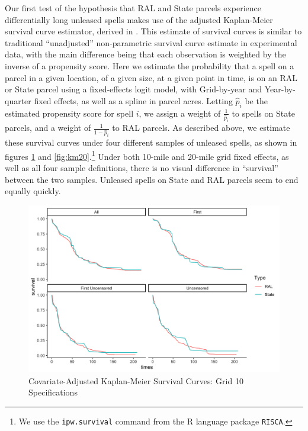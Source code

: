 \begin{appendices}
Our first test of the hypothesis that RAL and State parcels experience differentially long unleased spells makes use of the adjusted Kaplan-Meier survival curve estimator, derived in \cite{xie2005adjusted}.  This estimate of  survival curves is similar to traditional ``unadjusted'' non-parametric survival curve estimate in experimental data, with the main difference being that each observation is weighted by the inverse of a propensity score.  Here we estimate the probability that a spell on a parcel in a given location, of a given size, at a given point in time, is on an RAL or State parcel using a fixed-effects logit model, with Grid-by-year and Year-by-quarter fixed effects, as well as a spline in parcel acres.  Letting $\widehat{p}_i$ be the estimated propensity score for spell $i$, we assign a weight of $\frac{1}{\widehat{p}_i}$ to spells on State parcels, and a weight of $\frac{1}{1-\widehat{p}_i}$ to RAL parcels.  As described above, we estimate these survival curves under four different samples of unleased spells, as shown in figures \ref{fig:km10} and \ref{fig:km20}.\footnote{We use the \texttt{ipw.survival} command from the R language package \texttt{RISCA}.}  Under both 10-mile and 20-mile grid fixed effects, as well as all four sample definitions, there is no visual difference in ``survival'' between the two samples.  Unleased spells on State and RAL parcels seem to end equally quickly.

\begin{figure}[H]
	\centering
	\caption{Covariate-Adjusted Kaplan-Meier Survival Curves: Grid 10 Specifications}\label{fig:km10}
\includegraphics[width=1\textwidth]{../output/figures/ipwkm10.png}
\end{figure}


\end{appendices}
